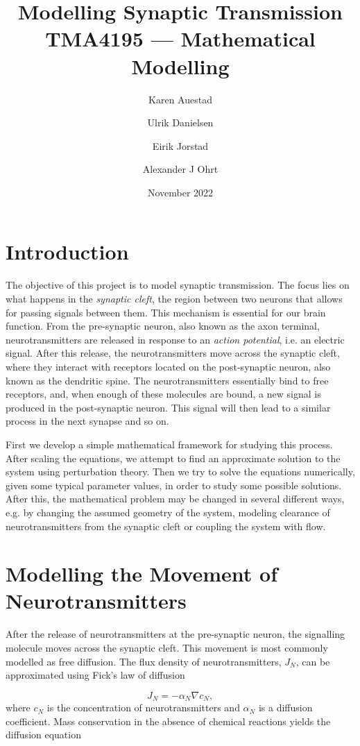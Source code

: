 \documentclass{article}
\title{Modelling Synaptic Transmission \\
\large TMA4195 — Mathematical Modelling}
\author{Karen Auestad \and Ulrik Danielsen \and Eirik Jorstad \and Alexander J Ohrt}
\date{November 2022}
\begin{document}
\maketitle

\section{Introduction}\label{Section:Intro}
The objective of this project is to model synaptic transmission. The focus lies on what happens in the \textit{synaptic cleft}, the region between two neurons that allows for passing signals between them. This mechanism is essential for our brain function. From the pre-synaptic neuron, also known as the axon terminal, neurotransmitters are released in response to an \textit{action potential}, i.e. an electric signal. After this release, the neurotransmitters move across the synaptic cleft, where they interact with receptors located on the post-synaptic neuron, also known as the dendritic spine. The neurotransmitters essentially bind to free receptors, and, when enough of these molecules are bound, a new signal is produced in the post-synaptic neuron. This signal will then lead to a similar process in the next synapse and so on. 

First we develop a simple mathematical framework for studying this process. After scaling the equations, we attempt to find an approximate solution to the system using perturbation theory. Then we try to solve the equations numerically, given some typical parameter values, in order to study some possible solutions. After this, the mathematical problem may be changed in several different ways, e.g. by changing the assumed geometry of the system, modeling clearance of neurotransmitters from the synaptic cleft or coupling the system with flow. 


\section{Modelling the Movement of Neurotransmitters}\label{Section:Diffusion}
After the release of neurotransmitters at the pre-synaptic neuron, the signalling molecule moves across the synaptic cleft. This movement is most commonly modelled as free diffusion. The flux density of neurotransmitters, $J_N$, can be approximated using Fick's law of diffusion

\begin{equation}
    J_N = -\alpha_N\nabla c_N,
    \label{Eq: Ficks Law}
\end{equation}
where $c_N$ is the concentration of neurotransmitters and $\alpha_N$ is a diffusion coefficient. Mass conservation in the absence of chemical reactions yields the diffusion equation 
\end{document}
